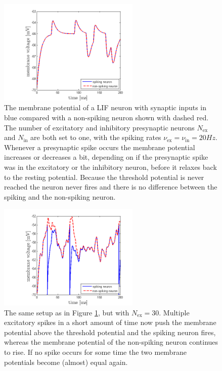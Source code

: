 \documentclass{scrartcl}
\begin{document}
\begin{figure}
\centering
\includegraphics[trim = {2.3cm 0 1cm 0.6cm}, width=0.6\textwidth, clip]{../pics/memv}
\caption{The membrane potential of a LIF neuron with synaptic inputs in blue compared with a non-spiking neuron shown with dashed red. The number of excitatory and inhibitory presynaptic neurons $N_\mathrm{ex}$ and $N_\mathrm{in}$ are both set to one, with the spiking rates $\nu_\mathrm{ex} = \nu_\mathrm{in} = 20\si{Hz}$. Whenever a presynaptic spike occurs the membrane potential increases or decreases a bit, depending on if the presynaptic spike was in the excitatory or the inhibitory neuron, before it relaxes back to the resting potential. Because the threshold potential is never reached the neuron never fires and there is no difference between the spiking and the non-spiking neuron.}
\label{memv}
\end{figure}

\begin{figure}
\centering
\includegraphics[trim = {2.3cm 0 1cm 0.6cm}, width=0.6\textwidth, clip]{../pics/memv_high_}
\caption{The same setup as in Figure \ref{memv}, but with $N_\mathrm{ex} = 30$. Multiple excitatory spikes in a short amount of time now push the membrane potential above the threshold potential and the spiking neuron fires, whereas the membrane potential of the non-spiking neuron continues to rise. If no spike occurs for some time the two membrane potentials become (almost) equal again.}
\label{memv_high}
\end{figure}
\end{document}
